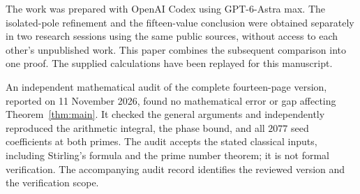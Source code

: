 The work was prepared with OpenAI Codex using GPT-6-Astra max.
The isolated-pole refinement and the fifteen-value conclusion were
obtained separately in two research sessions using the same public
sources, without access to each other's unpublished work. This paper
combines the subsequent comparison into one proof. The supplied
calculations have been replayed for this manuscript.

An independent mathematical audit of the complete fourteen-page version,
reported on 11 November 2026, found no mathematical error or gap affecting
Theorem~\ref{thm:main}. It checked the general arguments and independently
reproduced the arithmetic integral, the phase bound, and all $2077$ seed
coefficients at both primes. The audit accepts the stated classical inputs,
including Stirling's formula and the prime number theorem; it is not
formal verification. The accompanying audit record identifies the
reviewed version and the verification scope.
